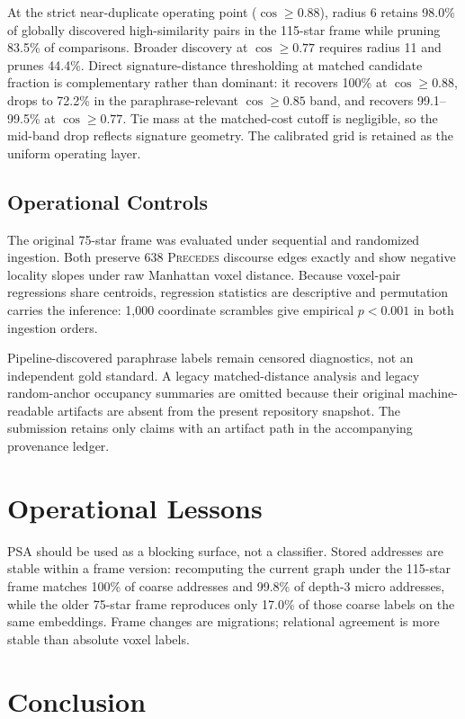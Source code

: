 \documentclass[11pt]{article}
\begin{document}
At the strict near-duplicate operating point ($\cos\geq0.88$), radius 6 retains 98.0\% of globally discovered high-similarity pairs in the 115-star frame while pruning 83.5\% of comparisons. Broader discovery at $\cos\geq0.77$ requires radius 11 and prunes 44.4\%. Direct signature-distance thresholding at matched candidate fraction is complementary rather than dominant: it recovers 100\% at $\cos\geq0.88$, drops to 72.2\% in the paraphrase-relevant $\cos\geq0.85$ band, and recovers 99.1--99.5\% at $\cos\geq0.77$. Tie mass at the matched-cost cutoff is negligible, so the mid-band drop reflects signature geometry. The calibrated grid is retained as the uniform operating layer.

\subsection{Operational Controls}

The original 75-star frame was evaluated under sequential and randomized ingestion. Both preserve 638 \textsc{Precedes} discourse edges exactly and show negative locality slopes under raw Manhattan voxel distance. Because voxel-pair regressions share centroids, regression statistics are descriptive and permutation carries the inference: 1,000 coordinate scrambles give empirical $p<0.001$ in both ingestion orders.

Pipeline-discovered paraphrase labels remain censored diagnostics, not an independent gold standard. A legacy matched-distance analysis and legacy random-anchor occupancy summaries are omitted because their original machine-readable artifacts are absent from the present repository snapshot. The submission retains only claims with an artifact path in the accompanying provenance ledger.

\section{Operational Lessons}

PSA should be used as a blocking surface, not a classifier. Stored addresses are stable within a frame version: recomputing the current graph under the 115-star frame matches 100\% of coarse addresses and 99.8\% of depth-3 micro addresses, while the older 75-star frame reproduces only 17.0\% of those coarse labels on the same embeddings. Frame changes are migrations; relational agreement is more stable than absolute voxel labels.

\section{Conclusion}
\end{document}
